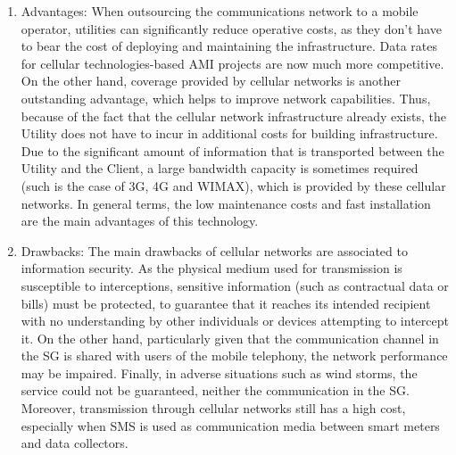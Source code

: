 \documentclass[11pt,final,onecolumn]{IEEEtran}
\begin{document}
\begin{enumerate}
	\item Advantages: When outsourcing the communications network to a mobile operator, utilities can significantly reduce operative costs, as they don’t have to bear the cost of deploying and maintaining the infrastructure. Data rates for cellular technologies-based AMI projects are now much more competitive. On the other hand, coverage provided by cellular networks is another outstanding advantage, which helps to improve network capabilities. Thus, because of the fact that the cellular network infrastructure already exists, the Utility does not have to incur in additional costs for building infrastructure. Due to the significant amount of information that is transported between the Utility and the Client, a large bandwidth capacity is sometimes required (such is the case of 3G, 4G and WIMAX), which is provided by these cellular networks. In general terms, the low maintenance costs and fast installation are the main advantages of this technology.

	\item Drawbacks: The main drawbacks of cellular networks are associated to information security. As the physical medium used for transmission is susceptible to interceptions, sensitive information (such as contractual data or bills) must be protected, to guarantee that it reaches its intended recipient with no understanding by other individuals or devices attempting to intercept it. On the other hand, particularly given that the communication channel in the SG is shared with users of the mobile telephony, the network performance may be impaired. Finally, in adverse situations such as wind storms, the service could not be guaranteed, neither the communication in the SG. Moreover, transmission through cellular networks still has a high cost, especially when SMS is used as communication media between smart meters and data collectors.
\end{enumerate}
\end{document}
